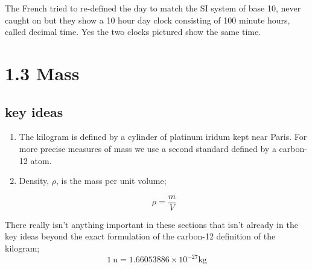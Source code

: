 \documentclass{article}
\begin{document}
The French tried to re-defined the day to match the SI system of base 10, never caught on but they show a 10 hour day clock consisting of 100 minute hours, called decimal time. Yes the two clocks pictured show the same time.

\section*{1.3 Mass}
\subsection*{key ideas}
\begin{enumerate}
	\item The kilogram is defined by a cylinder of platinum iridum kept near Paris. For more precise measures of mass we use a second standard defined by a carbon-12 atom.
	\item Density, $\rho$, is the mass per unit volume;

		\[
			\rho = \frac{m}{V}
		\]
\end{enumerate}

There really isn't anything important in these sections that isn't already in the key ideas beyond the exact formulation of the carbon-12 definition of the kilogram;
\[
	1\ \text{u} = 1.660 538 86 \times 10^{-27} \unit{\kilo\gram}
\]
\end{document}
